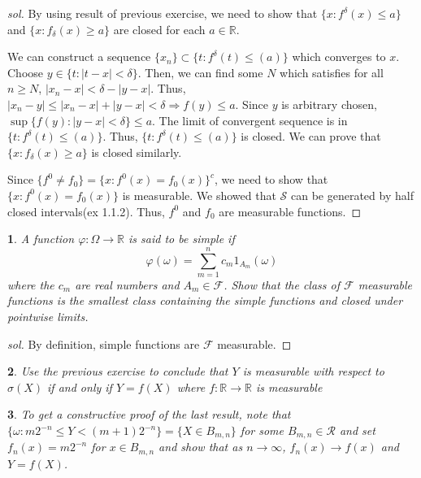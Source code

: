 \documentclass{report}
\newtheorem{ex}{}[section]
\begin{document}
\begin{proof}[sol]
By using result of previous exercise, we need to show that $\{x : f^\delta (x) \le a\}$ and $\{x : f_\delta(x) \ge a\}$ are closed for each $a \in \mathbb{R}$.

We can construct a sequence $\{x_n\} \subset \{t : f^\delta(t) \le (a)\}$ which converges to $x$. Choose $y \in \{t : |t - x| < \delta\}$. Then, we can find some $N$ which satisfies for all $n \ge N$, $|x_n - x| < \delta - |y - x|$. Thus, $|x_n - y| \le |x_n - x| + |y - x| <\delta \Rightarrow f(y) \le a$. Since $y$ is arbitrary chosen, $\sup\{f(y): |y-x| < \delta\} \le a$. The limit of convergent sequence is in $\{t : f^\delta(t) \le (a)\}$. Thus, $\{t : f^\delta(t) \le (a)\}$ is closed. We can prove that $\{x : f_\delta(x) \ge a\}$ is closed similarly.

Since $\{f^0 \ne f_0\} = \{x : f^0(x) = f_0(x)\}^c$, we need to show that $\{x : f^0(x) = f_0(x)\}$ is measurable. We showed that $\mathcal{S}$ can be generated by half closed intervals(ex 1.1.2). Thus, $f^0$ and $f_0$ are measurable functions.
\end{proof}
\begin{ex}
A function $\varphi : \Omega \to \mathbb{R}$ is said to be simple if
\[\varphi(\omega) = \sum_{m=1}^n c_m1_{A_m}(\omega)\]
where the $c_m$ are real numbers and $A_m \in \mathcal{F}$. Show that the class of $\mathcal{F}$ measurable functions is the smallest class containing the simple functions and closed under pointwise limits.
\end{ex}
\begin{proof}[sol]
By definition, simple functions are $\mathcal{F}$ measurable.
\end{proof}
\begin{ex}
Use the previous exercise to conclude that $Y$ is measurable with respect to $\sigma(X)$ if and only if $Y = f(X)$ where $f : \mathbb{R} \to \mathbb{R}$ is measurable
\end{ex}
\begin{ex}
To get a constructive proof of the last result, note that $\{\omega : m2^{-n} \le Y < (m+1)2^{-n}\} = \{X \in B_{m,n}\}$ for some $B_{m,n} \in \mathcal{R}$ and set $f_n(x) = m2^{-n}$ for $x \in B_{m,n}$ and show that as $n \to \infty$, $f_n(x) \to f(x)$ and $Y = f(X)$.
\end{ex}
\end{document}

